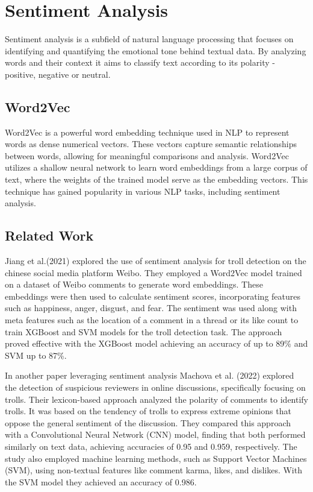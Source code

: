\documentclass[twoside]{ctuthesis}
\theoremstyle{plain}
\theoremstyle{definition}
\theoremstyle{note}
\begin{document}
\section{Sentiment Analysis}
Sentiment analysis is a subfield of natural language processing that focuses on identifying and quantifying the emotional tone behind textual data. By analyzing words and their context  it aims to classify text according to its polarity - positive, negative or neutral.\par

\subsection{Word2Vec}
Word2Vec is a powerful word embedding technique used in NLP to represent words as dense numerical vectors. These vectors capture semantic relationships between words, allowing for meaningful comparisons and analysis. Word2Vec utilizes a shallow neural network to learn word embeddings from a large corpus of text, where the weights of the trained model serve as the embedding vectors. This technique has gained popularity in various NLP tasks, including   sentiment analysis. \cite{Mikolov2013Word2vec}

\subsection{Related Work}
Jiang et al.(2021)\cite{Jiang2021Sentiment} explored the use of sentiment analysis for troll detection on the chinese social media platform Weibo.  They employed a Word2Vec model trained on a dataset of Weibo comments to generate word embeddings. These embeddings were then used to calculate sentiment scores, incorporating features such as happiness, anger, disgust, and fear. The sentiment was used along with meta features such as the location of a comment in a thread or its like count to train XGBoost and SVM models for the troll detection task. The approach proved effective with the XGBoost model achieving an accuracy of up to 89\% and SVM up to 87\%.\par
In another paper leveraging sentiment analysis Machova et al. (2022)\cite{Machova2022Comparison} explored the detection of suspicious reviewers in online discussions, specifically focusing on trolls. Their lexicon-based approach analyzed the polarity of comments to identify trolls. It was based on the tendency of trolls to express extreme opinions that oppose the general sentiment of the discussion. They compared this approach with a Convolutional Neural Network (CNN) model, finding that both performed similarly on text data, achieving accuracies of 0.95 and 0.959, respectively.  The study also employed machine learning methods, such as Support Vector Machines (SVM), using non-textual features like comment karma, likes, and dislikes. With the SVM model they achieved an accuracy of 0.986.
\end{document}
